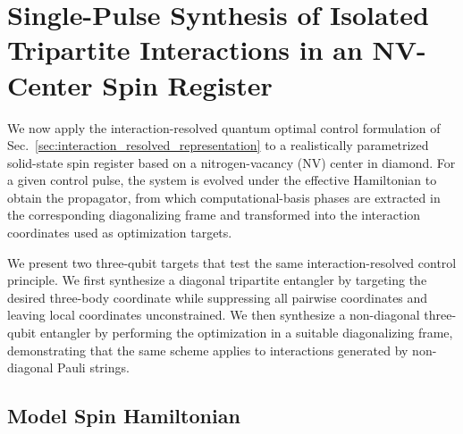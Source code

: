 \section{Single-Pulse Synthesis of Isolated Tripartite Interactions in an NV-Center Spin Register}
\label{sec:results}

\noindent
We now apply the interaction-resolved quantum optimal control formulation of Sec.~\ref{sec:interaction_resolved_representation} to a realistically parametrized solid-state spin register based on a nitrogen-vacancy (NV) center in diamond. For a given control pulse, the system is evolved under the effective Hamiltonian to obtain the propagator, from which computational-basis phases are extracted in the corresponding diagonalizing frame and transformed into the interaction coordinates used as optimization targets.

\medskip
\noindent
We present two three-qubit targets that test the same interaction-resolved control principle. We first synthesize a diagonal tripartite entangler by targeting the desired three-body coordinate while suppressing all pairwise coordinates and leaving local coordinates unconstrained. We then synthesize a non-diagonal three-qubit entangler by performing the optimization in a suitable diagonalizing frame, demonstrating that the same scheme applies to interactions generated by non-diagonal Pauli strings.

\subsection{Model Spin Hamiltonian}
\label{sec:spin_model}

